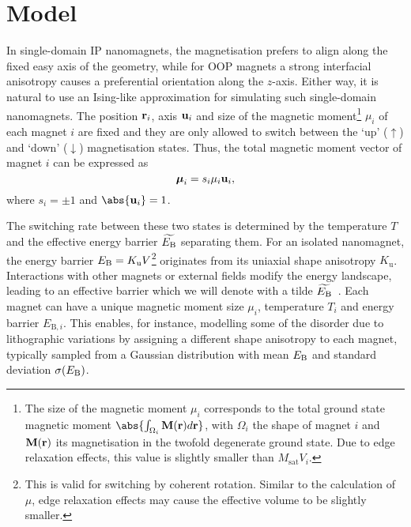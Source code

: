 \section{Model}
In single-domain IP nanomagnets, the magnetisation prefers to align along the fixed easy axis of the geometry, while for OOP magnets a strong interfacial anisotropy causes a preferential orientation along the $z$-axis.
Either way, it is natural to use an Ising-like approximation for simulating such single-domain nanomagnets.
The position $\boldsymbol{\mathbf{r}}_i$, axis $\boldsymbol{\mathbf{u}}_i$ and size of the magnetic moment\footnote{
	The size of the magnetic moment $\mu_i$ corresponds to the total ground state magnetic moment $\abs{\int_{\Omega_i} \vc{M}(\vc{r})d\vc{r}}$, with $\Omega_i$ the shape of magnet $i$ and $\boldsymbol{\mathbf{M}}(\boldsymbol{\mathbf{r}})$ its magnetisation in the twofold degenerate ground state. Due to edge relaxation effects, this value is slightly smaller than $M_\mathrm{sat} V_i$.
} $\mu_i$ of each magnet $i$ are fixed and they are only allowed to switch between the `up' ($\uparrow$) and `down' ($\downarrow$) magnetisation states.
Thus, the total magnetic moment vector of magnet $i$ can be expressed as
\begin{equation}
	\boldsymbol{\mathbf{\mu}}_i = s_i \mu_i \boldsymbol{\mathbf{u}}_i \mathrm{,}
\end{equation}
where $s_i = \pm 1$ and $\abs{\vc{u}_i} = 1$. \par
The switching rate between these two states is determined by the temperature $T$ and the effective energy barrier $\widetilde{E_\mathrm{B}}$ separating them.
For an isolated nanomagnet, the energy barrier $E_\mathrm{B} = K_\mathrm{u} V$\footnote{
	This is valid for switching by coherent rotation. Similar to the calculation of $\mu$, edge relaxation effects may cause the effective volume to be slightly smaller.
} originates from its uniaxial shape anisotropy $K_\mathrm{u}$.
Interactions with other magnets or external fields modify the energy landscape, leading to an effective barrier which we will denote with a tilde $\widetilde{E_\mathrm{B}}$~\cite{leo2021chiral}.
Each magnet can have a unique magnetic moment size $\mu_i$, temperature $T_i$ and energy barrier $E_{\mathrm{B},i}$.
This enables, for instance, modelling some of the disorder due to lithographic variations by assigning a different shape anisotropy to each magnet, typically sampled from a Gaussian distribution with mean $E_\mathrm{B}$ and standard deviation $\sigma(E_\mathrm{B})$. \\\par

